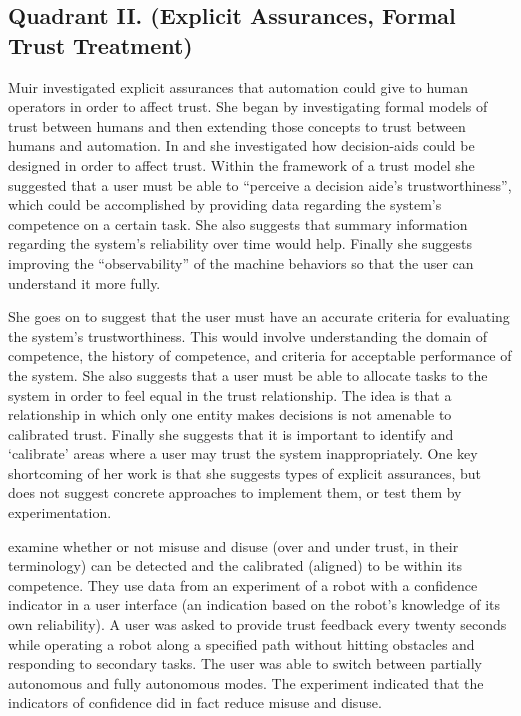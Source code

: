 \subsection{Quadrant II. (Explicit Assurances, Formal Trust Treatment)}\label{sec:q2}
Muir investigated explicit assurances that automation could give to human operators in order to affect trust. She began by investigating formal models of trust between humans and then extending those concepts to trust between humans and automation. In \cite{Muir1987-mk} and \cite{Muir1994-ow} she investigated how decision-aids could be designed in order to affect trust. Within the framework of a trust model she suggested that a user must be able to ``perceive a decision aide's trustworthiness'', which could be accomplished by providing data regarding the system's competence on a certain task. She also suggests that summary information regarding the system's reliability over time would help. Finally she suggests improving the ``observability'' of the machine behaviors so that the user can understand it more fully.

She goes on to suggest that the user must have an accurate criteria for evaluating the system's trustworthiness. This would involve understanding the domain of competence, the history of competence, and criteria for acceptable performance of the system. She also suggests that a user must be able to allocate tasks to the system in order to feel equal in the trust relationship. The idea is that a relationship in which only one entity makes decisions is not amenable to calibrated trust. Finally she suggests that it is important to identify and `calibrate' areas where a user may trust the system inappropriately. One key shortcoming of her work is that she suggests types of explicit assurances, but does not suggest concrete approaches to implement them, or test them by experimentation.

\citet{Kaniarasu2013-ho} examine whether or not misuse and disuse (over and under trust, in their terminology) can be detected and the calibrated (aligned) to be within its competence. They use data from an experiment of a robot with a confidence indicator in a user interface (an indication based on the robot's knowledge of its own reliability). A user was asked to provide trust feedback every twenty seconds while operating a robot along a specified path without hitting obstacles and responding to secondary tasks. The user was able to switch between partially autonomous and fully autonomous modes. The experiment indicated that the indicators of confidence did in fact reduce misuse and disuse.

